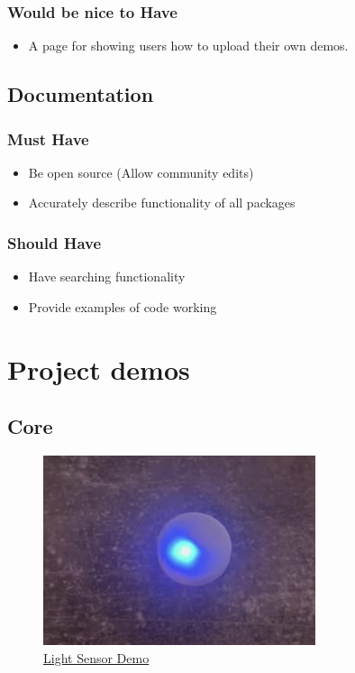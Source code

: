 \documentclass{l4proj}
\begin{document}
\begin{appendices}
\subsection{Would be nice to Have}
\begin{itemize}
    \item A page for showing users how to upload their own demos.
\end{itemize}


\section{Documentation}
\subsection{Must Have}
\begin{itemize}
    \item Be open source (Allow community edits)
    \item Accurately describe functionality of all packages
\end{itemize}
\subsection{Should Have}
\begin{itemize}
    \item Have searching functionality
    \item Provide examples of code working
\end{itemize}

\chapter{Project demos}


\label{appendix:projdemos}

\section{Core}

\begin{figure}[!ht]
    \centering
    \includegraphics[width=8cm]{dissertation/images/light-sensor-demo.png}
    \caption{\href{https://demos-mu.vercel.app/demo/light-sensor}{Light Sensor Demo}}
\end{figure}




\end{appendices}
\end{document}
